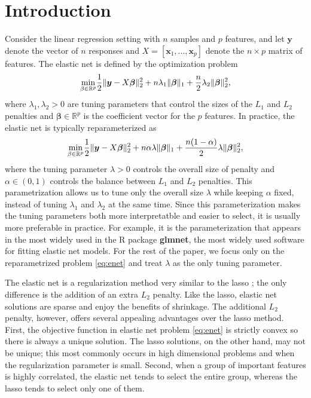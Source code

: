 \label{METHOD3}

\section{Introduction}

Consider the linear regression setting with $n$ samples and $p$ features, and let $\boldsymbol y$ denote the vector of $n$ responses and $X=[\boldsymbol x_1,...,\boldsymbol x_p]$ denote the $n\times p$ matrix of features. The elastic net \citep{zou2005regularization} is defined by the optimization problem 
\begin{equation}
    \label{eq:enet0}
    \underset{\beta\in \mathbb{R}^p}{\mathrm{min}}\frac{1}{2}\lVert\boldsymbol y-X\boldsymbol\beta\rVert_2^2+n\lambda_1\lVert\boldsymbol\beta\rVert_1+\frac{n}{2}\lambda_2\lVert\boldsymbol\beta\rVert_2^2,
\end{equation}
where $\lambda_1,\lambda_2> 0$ are tuning parameters that control the sizes of the $L_1$ and $L_2$ penalties and $\boldsymbol\beta\in\mathbb{R}^p$ is the coefficient vector for the $p$ features. In practice, the elastic net is typically reparameterized as
\begin{equation}
    \label{eq:enet}
    \underset{\beta\in \mathbb{R}^p}{\mathrm{min}}\frac{1}{2}\lVert\boldsymbol y-X\boldsymbol\beta\rVert_2^2+n\alpha\lambda\lVert\boldsymbol\beta\rVert_1+\frac{n(1-\alpha)}{2}\lambda\lVert\boldsymbol\beta\rVert_2^2,
\end{equation}
where the tuning parameter $\lambda>0$ controls the overall size of penalty and $\alpha\in(0,1)$ controls the balance between $L_1$ and $L_2$ penalties. This parametrization allows us to tune only the overall size $\lambda$ while keeping $\alpha$ fixed, instead of tuning $\lambda_1$ and $\lambda_2$ at the same time. Since this parameterization makes the tuning parameters both more interpretatble and easier to select, it is usually more preferable in practice. For example, it is the parameterization that appears in the most widely used in the R package \textbf{glmnet}, the most widely used software for fitting elastic net models. For the rest of the paper, we focus only on the reparametrized problem \eqref{eq:enet} and treat $\lambda$ as the only tuning parameter.

The elastic net is a regularization method very similar to the lasso \citep{tibshirani1996regression}; the only difference is the addition of an extra $L_2$ penalty. Like the lasso, elastic net solutions are sparse and enjoy the benefits of shrinkage. The additional $L_2$ penalty, however, offers several appealing advantages over the lasso method. First, the objective function in elastic net problem \eqref{eq:enet} is strictly convex so there is always a unique solution. The lasso solutions, on the other hand, may not be unique; this most commonly occurs in high dimensional problems and when the regularization parameter is small. Second, when a group of important features is highly correlated, the elastic net tends to select the entire group, whereas the lasso tends to select only one of them.

